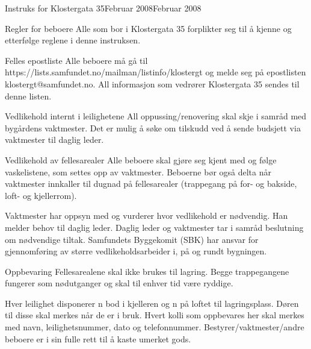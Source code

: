 \begin{instruks}{Instruks for Klostergata 35}{Februar 2008}{Februar 2008}
    \begin{instruksledd}{Regler for beboere}
        Alle som bor i Klostergata 35 forplikter seg til å kjenne og etterfølge reglene i
        denne instruksen.
    \end{instruksledd}

    \begin{instruksledd}{Felles epostliste}
        Alle beboere må gå til https://lists.samfundet.no/mailman/listinfo/klostergt og
        melde seg på epostlisten
        klostergt@samfundet.no. All informasjon som vedrører Klostergata 35 sendes til
        denne listen.
    \end{instruksledd}

    \begin{instruksledd}{Vedlikehold internt i leilighetene}
        All oppussing/renovering skal skje i samråd med bygårdens vaktmester. Det er mulig
        å søke om tilskudd ved å sende
        budsjett via vaktmester til daglig leder.
    \end{instruksledd}

    \begin{instruksledd}{Vedlikehold av fellesarealer}
        Alle beboere skal gjøre seg kjent med og følge vaskelistene, som settes opp av
        vaktmester. Beboerne bør også delta
        når vaktmester innkaller til dugnad på fellesarealer (trappegang på for- og
        bakside, loft- og kjellerrom).

        Vaktmester har oppsyn med og vurderer hvor vedlikehold er nødvendig. Han melder
        behov til daglig leder. Daglig
        leder og vaktmester tar i samråd beslutning om nødvendige tiltak. Samfundets
        Byggekomit (SBK) har ansvar for
        gjennomføring av større vedlikeholdsarbeider i, på og rundt bygningen.
    \end{instruksledd}

    \begin{instruksledd}{Oppbevaring}
        Fellesarealene skal ikke brukes til lagring. Begge trappegangene fungerer som
        nødutganger og skal til enhver tid være
        ryddige.

        Hver leilighet disponerer n bod i kjelleren og n på loftet til lagringsplass.
        Døren til disse skal merkes når de er i
        bruk. Hvert kolli som oppbevares her skal merkes med navn, leilighetsnummer, dato
        og telefonnummer.
        Bestyrer/vaktmester/andre beboere er i sin fulle rett til å kaste umerket gods.
    \end{instruksledd}


\end{instruks}
